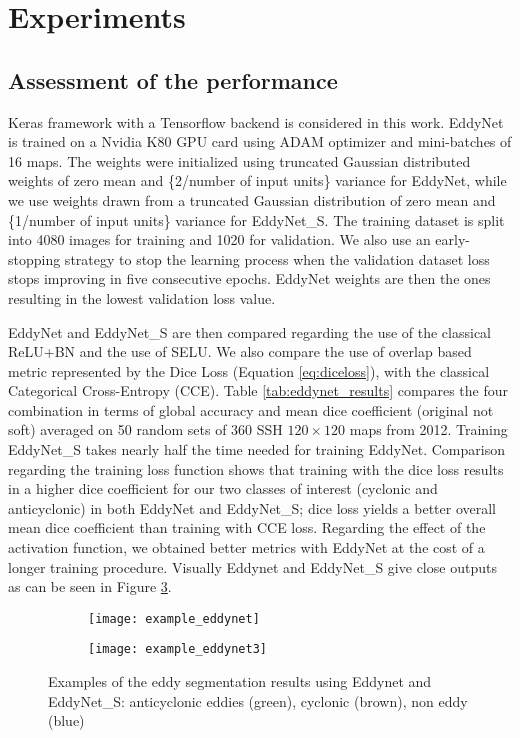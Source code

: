 \documentclass[journal]{IEEEtran}
\begin{document}
\section{Experiments}
\subsection{Assessment of the performance}
Keras framework \cite{chollet2015keras} with a Tensorflow backend is considered in this work. EddyNet is trained on a Nvidia K80 GPU card using ADAM optimizer \cite{kingma2014adam} and mini-batches of 16 maps. The weights were initialized using truncated Gaussian distributed weights of zero mean and \{2/number of input units\} variance \cite{he2015delving} for EddyNet, while we use weights drawn from a truncated Gaussian distribution of zero mean and \{1/number of input units\} variance for EddyNet\_S. The training dataset is split into 4080 images for training and 1020 for validation. We also use an early-stopping strategy to stop the learning process when the validation dataset loss stops improving in five consecutive epochs. EddyNet weights are then the ones resulting in the lowest validation loss value.

EddyNet and EddyNet\_S are then compared regarding the use of the classical ReLU+BN and the use of SELU. We also compare the use of overlap based metric represented by the Dice Loss (Equation \ref{eq:diceloss}), with the classical Categorical Cross-Entropy (CCE). Table \ref{tab:eddynet_results} compares the four combination in terms of global accuracy and mean dice coefficient (original not soft) averaged on 50 random sets of 360 SSH $120\times 120$ maps from 2012. Training EddyNet\_S takes nearly half the time needed for training EddyNet. Comparison regarding the training loss function shows that training with the dice loss results in a higher dice coefficient for our two classes of interest (cyclonic and anticyclonic) in both EddyNet and EddyNet\_S; dice loss yields a better overall mean dice coefficient than training with CCE loss. Regarding the effect of the activation function, we obtained better metrics with EddyNet at the cost of a longer training procedure. Visually Eddynet and EddyNet\_S give close outputs as can be seen in Figure \ref{fig:exampleeddynet}.

\begin{figure}
    \centering
    \begin{subfigure}[b]{0.3\textwidth}
       \centering \texttt{[image: example\_eddynet]}
       \caption{}\label{fig:example1}
    \end{subfigure}
\begin{subfigure}[b]{0.3\textwidth}
       \centering 
       \texttt{[image: example\_eddynet3]}
       \caption{}\label{fig:example2}
    \end{subfigure}
\caption{Examples of the eddy segmentation results using Eddynet and EddyNet\_S: anticyclonic eddies (green), cyclonic (brown), non eddy (blue)}
\label{fig:exampleeddynet}
\end{figure}
\end{document}
